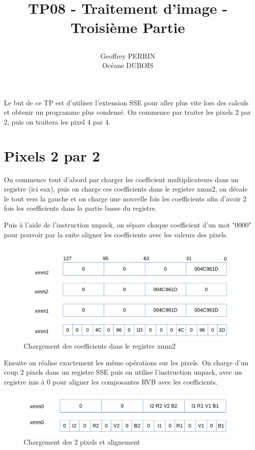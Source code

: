\documentclass[11pt]{report}
\title{\textbf{TP08 - Traitement d'image - Troisième Partie }
\author{Geoffrey PERRIN \\ Océane DUBOIS\\}
\date{}}
\begin{document}
\maketitle

\newpage

Le but de ce TP est d'utiliser l'extension SSE pour aller plus vite lors des calculs et obtenir un programme plus condensé.
On commence par traiter les pixels 2 par 2, puis on traitera les pixel 4 par 4.

\section{Pixels 2 par 2}

On commence tout d'abord par charger les coefficient multiplicateurs dans un registre (ici eax), puis on charge ces coefficients dans le registre xmm2, on décale le tout vers la gauche et on charge une nouvelle fois les coefficients afin d'avoir 2 fois les coefficients dans la partie basse du registre.


Puis à l'aide de l'instruction unpack, on sépare chaque coefficient d'un mot "0000" pour pouvoir par la suite aligner les coefficients avec les valeurs des pixels. 

\begin{figure}[htp]
\centering
\includegraphics[scale=0.2]{charge_coeff.png}
\caption{Chargement des coefficients dans le registre xmm2}

\end{figure}




Ensuite on réalise exactement les même opérations sur les pixels. On charge d'un coup 2 pixels dans un registre SSE puis on utilise l'instruction unpack, avec un registre mis à 0 pour aligner les composantes RVB avec les coefficients. 
\begin{figure}[htp]
\centering
\includegraphics[scale=0.2]{chargement_pixel.png}
\caption{Chargement des 2 pixels et alignement}
\label{}
\end{figure}
\end{document}
